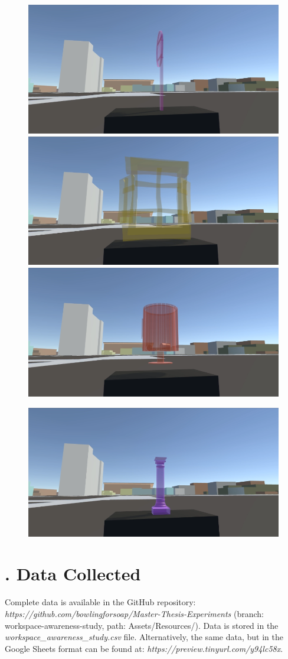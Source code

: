 \begin{appendices}
\begin{figure}
	\includegraphics[width=0.7\linewidth]{figures/tracing_shapes/finalstudy_shapes10}
	\par
	\includegraphics[width=0.7\linewidth]{figures/tracing_shapes/finalstudy_shapes11}
	\par
	\includegraphics[width=0.7\linewidth]{figures/tracing_shapes/finalstudy_shapes12}
\end{figure}
\begin{figure}
	\centering
	\includegraphics[width=0.7\linewidth]{figures/tracing_shapes/finalstudy_shapes13}
\end{figure}


\chapter{. Data Collected}
\label{app:final_study_data_collected}
Complete data is available in the GitHub repository: \textit{https://github.com/bowlingforsoap/Master-Thesis-Experiments} (branch: workspace-awareness-study, path: Assets/Resources/). Data is stored in the \textit{workspace\_awareness\_study.csv} file. Alternatively, the same data, but in the Google Sheets format can be found at: \textit{https://preview.tinyurl.com/y94lc58x}.


\end{appendices}
